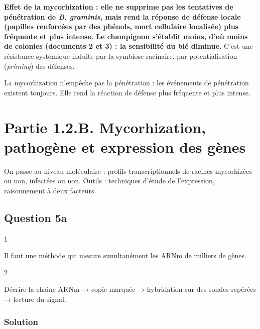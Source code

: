 \documentclass[11pt,a4paper]{article}
\begin{document}
\textbf{Effet de la mycorhization : elle ne supprime pas les tentatives de pénétration de \emph{B. graminis}, mais rend la réponse de défense locale (papilles renforcées par des phénols, mort cellulaire localisée) plus fréquente et plus intense. Le champignon s'établit moins, d'où moins de colonies (documents 2 et 3) : la sensibilité du blé diminue.} C'est une résistance systémique induite par la symbiose racinaire, par potentialisation (\emph{priming}) des défenses.

\begin{piege}

La mycorhization n'empêche pas la pénétration : les événements de pénétration existent toujours. Elle rend la réaction de défense plus fréquente et plus intense.

\end{piege}

\hypertarget{partie-1.2.b.-mycorhization-pathoguxe8ne-et-expression-des-guxe8nes}{%
\section{Partie 1.2.B. Mycorhization, pathogène et expression des gènes}\label{partie-1.2.b.-mycorhization-pathoguxe8ne-et-expression-des-guxe8nes}}

On passe au niveau moléculaire : profils transcriptionnels de racines mycorhizées ou non, infectées ou non. Outils : techniques d'étude de l'expression, raisonnement à deux facteurs.

\hypertarget{question-5a}{%
\subsection{Question 5a}\label{question-5a}}

\begin{indication}{1}

Il faut une méthode qui mesure simultanément les ARNm de milliers de gènes.

\end{indication}

\begin{indication}{2}

Décrire la chaîne ARNm → copie marquée → hybridation sur des sondes repérées → lecture du signal.

\end{indication}

\hypertarget{solution-9}{%
\subsubsection{Solution}\label{solution-9}}
\end{document}
